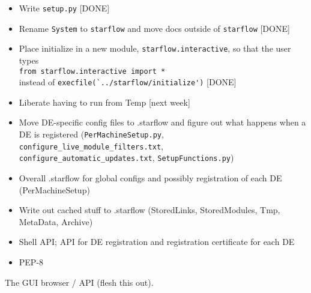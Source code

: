 \documentclass[11pt]{article}
\begin{document}
\begin{itemize}
	\item{Write \verb|setup.py| [DONE]}
	\item{Rename \verb|System| to \verb|starflow| and move docs outside of \verb|starflow| [DONE]}
	\item{Place initialize in a new module, \verb|starflow.interactive|, so that the user types \\
	\verb|from starflow.interactive import *| \\
	instead of \verb|execfile(`../starflow/initialize')| [DONE]}
	\item{Liberate having to run from Temp [next week]}
	\item{Move DE-specific config files to .starflow and figure out what happens when a DE is 
	registered (\verb|PerMachineSetup.py|, \verb|configure_live_module_filters.txt|, \\
	\verb|configure_automatic_updates.txt|, \verb|SetupFunctions.py|)}
	\item{Overall .starflow for global configs and possibly registration of each DE 
	(PerMachineSetup)}
	\item{Write out cached stuff to .starflow (StoredLinks, StoredModules, Tmp, MetaData, Archive)}
	\item{Shell API; API for DE registration and registration certificate for each DE}
	\item{PEP-8}
\end{itemize}

The GUI browser / API (flesh this out).
	
\end{document}
